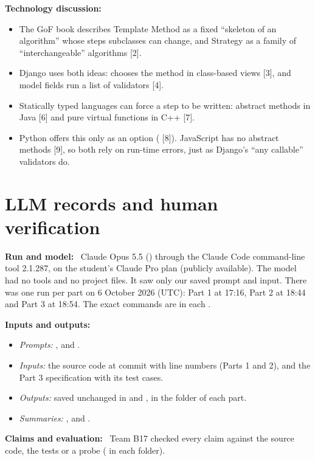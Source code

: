 \documentclass[11pt,a4paper]{article}
\newcommand{\field}[1]{\textbf{#1:}\ }
\newcommand{\code}[1]{\texttt{\detokenize{#1}}}
\begin{document}
\field{Technology discussion}
\begin{itemize}
\item The GoF book describes Template Method as a fixed ``skeleton of an algorithm'' whose steps subclasses can change, and Strategy as a family of ``interchangeable'' algorithms [2].
\item Django uses both ideas: \code{dispatch()} chooses the method in class-based views [3], and model fields run a list of validators [4].
\item Statically typed languages can force a step to be written: abstract methods in Java [6] and pure virtual functions in C++ [7].
\item Python offers this only as an option (\code{abc} [8]). JavaScript has no abstract methods [9], so both rely on run-time errors, just as Django's ``any callable'' validators do.
\end{itemize}

\section{LLM records and human verification}
\field{Run and model} Claude Opus 5.5 (\code{claude-opus-5-5}) through the Claude Code command-line tool 2.1.287, on the student's Claude Pro plan (publicly available).
The model had no tools and no project files. It saw only our saved prompt and input.
There was one run per part on 6 October 2026 (UTC): Part 1 at 17:16, Part 2 at 18:44 and Part 3 at 18:54.
The exact commands are in each .\par
\field{Inputs and outputs}
\begin{itemize}
\item \emph{Prompts:} ,  and .
\item \emph{Inputs:} the source code at commit \code{5943319} with line numbers (Parts 1 and 2), and the Part 3 specification with its test cases.
\item \emph{Outputs:} saved unchanged in  and , in the  folder of each part.
\item \emph{Summaries:} ,  and .
\end{itemize}
\field{Claims and evaluation} Team B17 checked every claim against the source code, the tests or a probe ( in each  folder).
\end{document}
